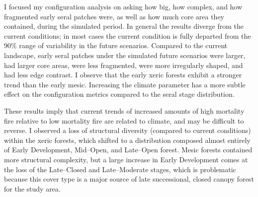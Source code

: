 I focused my configuration analysis on asking how big, how complex, and how fragmented early seral patches were, as well as how much core area they contained, during the simulated period. In general the results diverge from the current conditions; in most cases the current condition is fully departed from the 90\% range of variability in the future scenarios. Compared to the current landscape, early seral patches under the simulated future scenarios were larger, had larger core areas, were less fragmented, were more irregularly shaped, and had less edge contrast. I observe that the early xeric forests exhibit a stronger trend than the early mesic. Increasing the climate parameter has a more subtle effect on the configuration metrics compared to the seral stage distribution.

These results imply that current trends of increased amounts of high mortality fire relative to low mortality fire are related to climate, and may be difficult to reverse. I observed a loss of structural diversity (compared to current conditions) within the xeric forests, which shifted to a distribution composed almost entirely of Early Development, Mid--Open, and Late--Open forest. Mesic forests contained more structural complexity, but a large increase in Early Development comes at the loss of the Late--Closed and Late--Moderate stages, which is problematic because this cover type is a major source of late successional, closed canopy forest for the study area.




